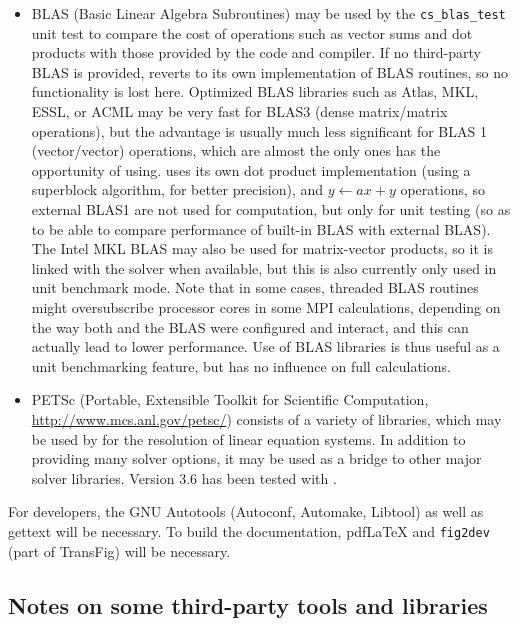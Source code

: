 \documentclass[a4paper,10pt,twoside]{csshortdoc}
\begin{document}
\begin{itemize}
\item BLAS (Basic Linear Algebra Subroutines) may be used by the
      \texttt{cs\_blas\_test} unit test to compare the cost of operations
      such as vector sums and dot products with those provided
      by the code and compiler.
      If no third-party BLAS is provided, \CS reverts to its own
      implementation of BLAS routines, so no functionality is lost here.
      Optimized BLAS libraries such as Atlas, MKL, ESSL, or ACML may be very
      fast for BLAS3 (dense matrix/matrix operations), but the advantage is
      usually much less significant for BLAS 1 (vector/vector) operations, which
      are almost the only ones \CS has the opportunity of using.
      \CS uses its own dot product implementation (using a superblock algorithm,
      for better precision), and $y \leftarrow ax+y$ operations, so external
      BLAS1 are not used for computation, but only for unit testing (so as
      to be able to compare performance of built-in BLAS with external BLAS).
      The Intel MKL BLAS may also be used for matrix-vector products, so it
      is linked with the solver when available, but this is also currently only
      used in unit benchmark mode.
      Note that in some cases, threaded BLAS routines might oversubscribe
      processor cores in some MPI calculations, depending on the way both
      \CS and the BLAS were configured and interact, and this can actually
      lead to lower performance.
      Use of BLAS libraries is thus useful as a unit benchmarking feature,
      but has no influence on full calculations.

\item PETSc (Portable, Extensible Toolkit for Scientific Computation,
      \url{http://www.mcs.anl.gov/petsc/}) consists  of a variety of libraries,
      which may be used by \CS for the resolution of linear equation systems.
      In addition to providing many solver options, it may be used as a bridge
      to other major solver libraries. Version 3.6 has been tested with \CS.

\end{itemize}

For developers, the GNU Autotools (Autoconf, Automake, Libtool) as
well as gettext will be necessary. To build the documentation,
pdf\LaTeX{} and \texttt{fig2dev} (part of TransFig) will be necessary.

\subsection{Notes on some third-party tools and libraries}
\end{document}
